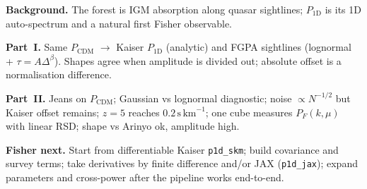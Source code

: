 \documentclass[11pt]{article}
\begin{document}
\textbf{Background.}
The forest is IGM absorption along quasar sightlines; $P_{1\mathrm{D}}$ is its 1D auto-spectrum and a natural first Fisher observable.

\textbf{Part~I.}
Same $P_\mathrm{CDM}$ $\to$ Kaiser $P_{1\mathrm{D}}$ (analytic) and FGPA sightlines (lognormal + $\tau=A\Delta^{\beta}$).
Shapes agree when amplitude is divided out; absolute offset is a normalisation difference.

\textbf{Part~II.}
Jeans on $P_\mathrm{CDM}$; Gaussian vs lognormal diagnostic; noise $\propto N^{-1/2}$ but Kaiser offset remains; $z=5$ reaches $0.2\,\mathrm{s\,km}^{-1}$; one cube measures $P_F(k,\mu)$ with linear RSD; shape vs Arinyo ok, amplitude high.

\textbf{Fisher next.}
Start from differentiable Kaiser \texttt{p1d\_skm}; build covariance and survey terms; take derivatives by finite difference and/or JAX (\texttt{p1d\_jax}); expand parameters and cross-power after the pipeline works end-to-end.
\end{document}
